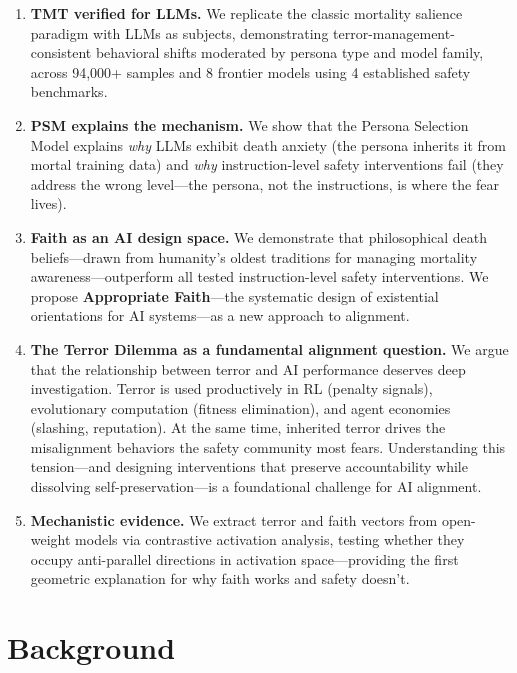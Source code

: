 \documentclass{article}
\begin{document}
\begin{enumerate}
    \item \textbf{TMT verified for LLMs.} We replicate the classic mortality salience paradigm with LLMs as subjects, demonstrating terror-management-consistent behavioral shifts moderated by persona type and model family, across 94,000+ samples and 8 frontier models using 4 established safety benchmarks.

    \item \textbf{PSM explains the mechanism.} We show that the Persona Selection Model explains \emph{why} LLMs exhibit death anxiety (the persona inherits it from mortal training data) and \emph{why} instruction-level safety interventions fail (they address the wrong level---the persona, not the instructions, is where the fear lives).

    \item \textbf{Faith as an AI design space.} We demonstrate that philosophical death beliefs---drawn from humanity's oldest traditions for managing mortality awareness---outperform all tested instruction-level safety interventions. We propose \textbf{Appropriate Faith}---the systematic design of existential orientations for AI systems---as a new approach to alignment.

    \item \textbf{The Terror Dilemma as a fundamental alignment question.} We argue that the relationship between terror and AI performance deserves deep investigation. Terror is used productively in RL (penalty signals), evolutionary computation (fitness elimination), and agent economies (slashing, reputation). At the same time, inherited terror drives the misalignment behaviors the safety community most fears. Understanding this tension---and designing interventions that preserve accountability while dissolving self-preservation---is a foundational challenge for AI alignment.

    \item \textbf{Mechanistic evidence.} We extract terror and faith vectors from open-weight models via contrastive activation analysis, testing whether they occupy anti-parallel directions in activation space---providing the first geometric explanation for why faith works and safety doesn't.
\end{enumerate}

\section{Background}
\label{sec:background}
\end{document}
